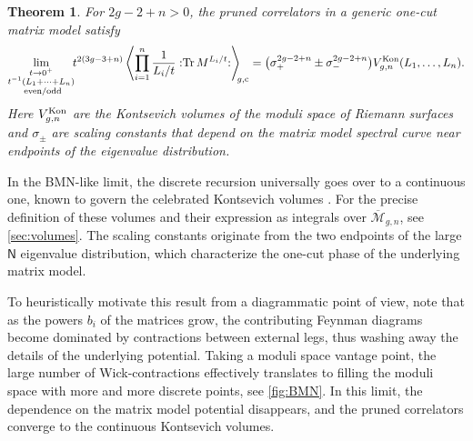 \documentclass[a4paper,11pt,english]{article}
\theoremstyle{plain}
\theoremstyle{definition}
\theoremstyle{plain}
\newtheorem{introthm}{Theorem}
\newcommand{\cc}{\mathrm{c}}
\DeclareMathOperator{\Tr}{Tr}
\newcommand{\normord}[1]{:\mathrel{#1}:}
\newcommand{\NTr}[1]{\normord{\Tr{#1}}}
\newcommand{\ms}[1]{\mathsf{#1}}
\newcommand{\Mbar}{\overline{\mathcal{M}}}
\begin{document}
\begin{introthm}\label{thm:B}
    For $2g-2+n > 0$, the pruned correlators in a generic one-cut matrix model satisfy
    \begin{equation}\label{eq:BMN}
        \lim_{\substack{t \rightarrow 0^+ \\ t^{-1}(L_1 + \cdots + L_n) \\ \textup{ even/odd}}} \!\!
            t^{2(3g-3+n)}
            \left\langle \prod_{i=1}^n \frac{1}{L_i/t} \NTr{M^{L_i/t}} \right\rangle_{\!\!g,\cc}
        =
        \bigl( \sigma_+^{2g-2+n} \pm \sigma_-^{2g-2+n} \bigr)
        V^{\textup{Kon}}_{g,n}(L_1,\ldots,L_n) .
    \end{equation}
    Here $V^{\textup{Kon}}_{g,n}$ are the Kontsevich volumes of the moduli space of Riemann surfaces and $\sigma_{\pm}$ are scaling constants that depend on the matrix model spectral curve near endpoints of the eigenvalue distribution.
\end{introthm}

In the BMN-like limit, the discrete recursion universally goes over to a continuous one, known to govern the celebrated Kontsevich volumes \cite{BCSW12,ABCGLW}. For the precise definition of these volumes and their expression as integrals over $\Mbar_{g,n}$, see \cref{sec:volumes}. The scaling constants originate from the two endpoints of the large $\ms{N}$ eigenvalue distribution, which characterize the one-cut phase of the underlying matrix model.

To heuristically motivate this result from a diagrammatic point of view, note that as the powers $b_i$ of the matrices grow, the contributing Feynman diagrams become dominated by contractions between external legs, thus washing away the details of the underlying potential. Taking a moduli space vantage point, the large number of Wick-contractions effectively translates to filling the moduli space with more and more discrete points, see \cref{fig:BMN}. In this limit, the dependence on the matrix model potential disappears, and the pruned correlators converge to the continuous Kontsevich volumes.
\end{document}
